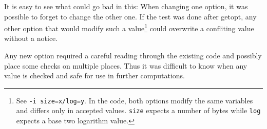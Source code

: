 It is easy to see what could go bad in this: When changing one option, it was possible to forget to change the other one. If the test was done after getopt, any other option that would modify such a value\footnote{See {\tt -i size=x/log=y}. In the code, both options modify the same variables and differs only in accepted values. {\tt size} expects a number of bytes while {\tt log} expects a base two logarithm value.} could overwrite a confliting value without a notice.

Any new option required a careful reading through the existing code and possibly place some checks on multiple places. Thus it was difficult to know when any value is checked and safe for use in further computations.



